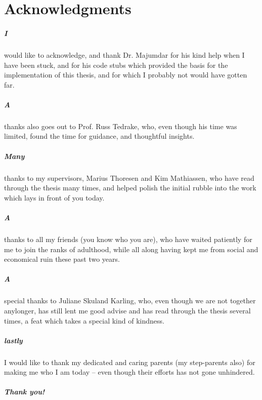 \chapter{Acknowledgments}

\paragraph{I} would like to acknowledge, and thank Dr. Majumdar for his kind
help when I have been stuck, and for his code stubs which provided the basis for
the implementation of this thesis, and for which I probably not would have
gotten far.


\paragraph{A} thanks also goes out to Prof. Russ Tedrake, who, even though his
time was limited, found the time for guidance, and thoughtful insights.

\paragraph{Many} thanks to my supervisors, Marius Thoresen and Kim Mathiassen,
who have read through the thesis many times, and helped polish the initial
rubble into the work which lays in front of you today.

\paragraph{A} thanks to all my friends (you know who you are), who have waited
patiently for me to join the ranks of adulthood, while all along having kept me
from social and economical ruin these past two years.

\paragraph{A} special thanks to Juliane Skuland Karling, who, even though we are
not together anylonger, has still lent me good advise and has read through the
thesis several times, a feat which takes a special kind of kindness.

\paragraph{lastly} I would like to thank my dedicated and caring parents
(my step-parents also) for making me who I am today -- even though their efforts
has not gone unhindered.


\paragraph{Thank you!}
